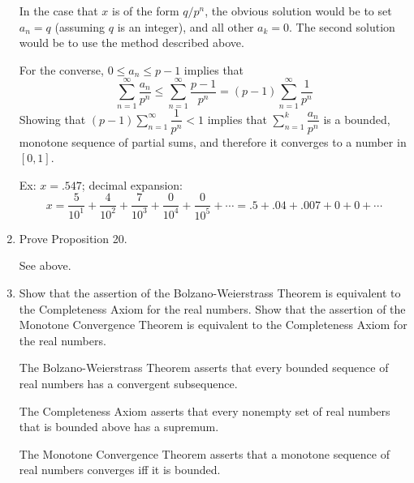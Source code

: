 \begin{enumerate}
	In the case that $x$ is of the form $q/p^n$, the obvious solution would be to set $a_n =q$ (assuming $q$ is an integer), and all other $a_k=0$.
	The second solution would be to use the method described above.\par
	For the converse,  $0\le a_n \le p-1$ implies that 
	\[
		\sum_{n=1}^\infty\dfrac{a_n}{p^n} \le \sum_{n=1}^\infty\dfrac{p-1}{p^n}=(p-1)\sum_{n=1}^\infty\dfrac{1}{p^n}
	\]
	Showing that $(p-1)\sum_{n=1}^\infty\dfrac{1}{p^n} <1$ implies that $\sum_{n=1}^k\dfrac{a_n}{p^n}$ is a bounded, monotone sequence of partial sums, and therefore it converges to a number in $[0,1]$.\par
	\par
	Ex: $x=.547$; decimal expansion: \[x=\frac{5}{10^1}+\frac{4}{10^2}+\frac{7}{10^3}+\frac{0}{10^4}+\frac{0}{10^5}+\cdots=.5+.04+.007+0+0+\cdots\]
	\item Prove Proposition 20.\par
	See above.
	\item Show that the assertion of the Bolzano-Weierstrass Theorem is equivalent to the Completeness Axiom for the real numbers. Show that the assertion of the Monotone Convergence Theorem is equivalent to the Completeness Axiom for the real numbers.\par
	The Bolzano-Weierstrass Theorem asserts that every bounded sequence of real numbers has a convergent subsequence.\par
	The Completeness Axiom asserts that every nonempty set of real numbers that is bounded above has a supremum.\par
	The Monotone Convergence Theorem asserts that a monotone sequence of real numbers converges iff it is bounded.
\end{enumerate}


